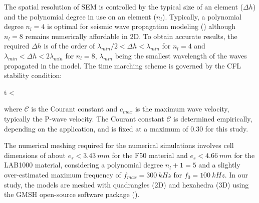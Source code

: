 \documentclass[extra,mreferee]{gji}
\newenvironment{greennote}{\par\color{OliveGreen}}{\par}
\begin{document}
The spatial resolution of SEM is controlled by the typical size of an element ($\Delta h$) and the polynomial degree in use on an element ($n_{l}$). Typically, a polynomial degree $n_{l}=4$ is optimal for seismic wave propagation modeling (\cite{moczo2011finite}) although $n_{l}=8$ remains numerically affordable in 2D. To obtain accurate results, the required $\Delta h$ is of the order of $\lambda_{min} /2 < \Delta h < \lambda_{min}$ for $n_{l}=4$ and $\lambda_{min} < \Delta h < 2\lambda_{min}$ for $n_{l}=8$, $\lambda_{min}$ being the smallest wavelength of the waves propagated in the model. The time marching scheme is governed by the CFL stability condition:

\equation
\Delta t < \,
\endequation

where $\mathcal{C}$ is the Courant constant and $c_{max}$ is the maximum wave velocity, typically the P-wave velocity. The Courant constant $\mathcal{C}$ is determined empirically, depending on the application, and is fixed at a maximum of 0.30 for this study.

The numerical meshing required for the numerical simulations involves cell dimensions of about $e_{s}<3.43\ mm$ for the F50 material and $e_{s}<4.66\ mm$ for the LAB1000 material, considering a polynomial degree $n_{l}+1=5$ and a slightly over-estimated maximum frequency of $f_{max}=300\ kHz$ for $f_{0}=100\ kHz$. In our study, the models are meshed with quadrangles (2D) and hexahedra (3D) using the GMSH open-source software package (\cite{Geuzaine_MSH_2009}).



\end{document}
